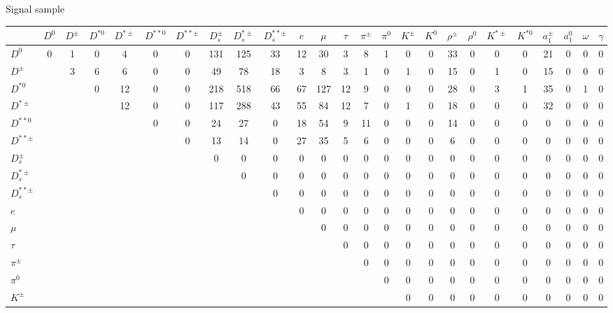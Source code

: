 \documentclass[6pt]{article}
\begin{document}
Signal sample
\begin{landscape} \begin{tabular}{|l||cccc|cc|ccc|ccc|cccc|cccc|cccc|}
\hline
 & $D^0$ & $D^{\pm}$ & $D^{*0}$ & $D^{*\pm}$ & $D^{**0}$ & $D^{**\pm}$ & $D_s^{\pm}$ & $D_s^{*\pm}$ & $D_s^{**\pm}$ & $e$ & $\mu$ & $\tau$ & $\pi^{\pm}$ & $\pi^0$ & $K^{\pm}$ & $K^0$ & $\rho^{\pm}$ & $\rho^0$ & $K^{*\pm}$ & $K^{*0}$ & $a_1^{\pm}$ & $a_1^0$ & $\omega$ & $\gamma$ \\ \hline \hline
$D^0$  & 0 & 1 & 0 & 4 & 0 & 0 & 131 & 125 & 33 & 12 & 30 & 3 & 8 & 1 & 0 & 0 & 33 & 0 & 0 & 0 & 21 & 0 & 0 & 0 \\
$D^{\pm}$  &  & 3 & 6 & 6 & 0 & 0 & 49 & 78 & 18 & 3 & 8 & 3 & 1 & 0 & 1 & 0 & 15 & 0 & 1 & 0 & 15 & 0 & 0 & 0 \\
$D^{*0}$  &  &  & 0 & 12 & 0 & 0 & 218 & 518 & 66 & 67 & 127 & 12 & 9 & 0 & 0 & 0 & 28 & 0 & 3 & 1 & 35 & 0 & 1 & 0 \\
$D^{*\pm}$  &  &  &  & 12 & 0 & 0 & 117 & 288 & 43 & 55 & 84 & 12 & 7 & 0 & 1 & 0 & 18 & 0 & 0 & 0 & 32 & 0 & 0 & 0 \\
\hline 
$D^{**0}$  &  &  &  &  & 0 & 0 & 24 & 27 & 0 & 18 & 54 & 9 & 11 & 0 & 0 & 0 & 14 & 0 & 0 & 0 & 0 & 0 & 0 & 0 \\
$D^{**\pm}$  &  &  &  &  &  & 0 & 13 & 14 & 0 & 27 & 35 & 5 & 6 & 0 & 0 & 0 & 6 & 0 & 0 & 0 & 0 & 0 & 0 & 0 \\
\hline 
$D_s^{\pm}$  &  &  &  &  &  &  & 0 & 0 & 0 & 0 & 0 & 0 & 0 & 0 & 0 & 0 & 0 & 0 & 0 & 0 & 0 & 0 & 0 & 0 \\
$D_s^{*\pm}$  &  &  &  &  &  &  &  & 0 & 0 & 0 & 0 & 0 & 0 & 0 & 0 & 0 & 0 & 0 & 0 & 0 & 0 & 0 & 0 & 0 \\
$D_s^{**\pm}$  &  &  &  &  &  &  &  &  & 0 & 0 & 0 & 0 & 0 & 0 & 0 & 0 & 0 & 0 & 0 & 0 & 0 & 0 & 0 & 0 \\
\hline 
$e$  &  &  &  &  &  &  &  &  &  & 0 & 0 & 0 & 0 & 0 & 0 & 0 & 0 & 0 & 0 & 0 & 0 & 0 & 0 & 0 \\
$\mu$  &  &  &  &  &  &  &  &  &  &  & 0 & 0 & 0 & 0 & 0 & 0 & 0 & 0 & 0 & 0 & 0 & 0 & 0 & 0 \\
$\tau$  &  &  &  &  &  &  &  &  &  &  &  & 0 & 0 & 0 & 0 & 0 & 0 & 0 & 0 & 0 & 0 & 0 & 0 & 0 \\
\hline 
$\pi^{\pm}$  &  &  &  &  &  &  &  &  &  &  &  &  & 0 & 0 & 0 & 0 & 0 & 0 & 0 & 0 & 0 & 0 & 0 & 0 \\
$\pi^0$  &  &  &  &  &  &  &  &  &  &  &  &  &  & 0 & 0 & 0 & 0 & 0 & 0 & 0 & 0 & 0 & 0 & 0 \\
$K^{\pm}$  &  &  &  &  &  &  &  &  &  &  &  &  &  &  & 0 & 0 & 0 & 0 & 0 & 0 & 0 & 0 & 0 & 0 \\

\end{tabular}
\end{landscape}
\end{document}
